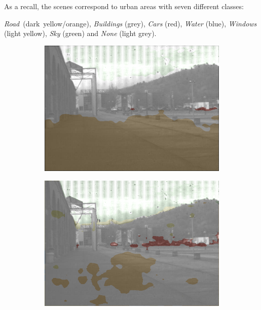 As a recall, the scenes correspond to urban areas with seven different classes:

	\mbox{\textit{Road} (\textcolor{road}{dark yellow/orange})}, \textit{Buildings} (\textcolor{buildings}{grey}), \textit{Cars} (\textcolor{car}{red}), \textit{Water} (\textcolor{water}{blue}), \textit{Windows} (\textcolor{windows}{light yellow}), \textit{Sky} (\textcolor{sky}{green}) and \textit{None} (\textcolor{none}{light grey}).

\begin{figure}[h]
	\centering
	\begin{subfigure}[b]{0.3\linewidth}
		\centering
		\includegraphics[width=\linewidth]{Figures/Aug/NA1/selected_images/overlayed/over0.png}
	\end{subfigure}
	\begin{subfigure}[b]{0.3\linewidth}  
		\centering 
		\includegraphics[width=\linewidth]{Figures/Aug/BA1/selected_images/overlayed/over0.png}

\end{subfigure}
\end{figure}
